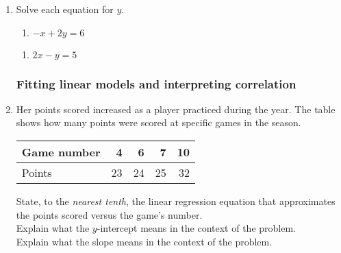 \documentclass[12pt, oneside]{article}
\begin{document}
\begin{enumerate}
  \item Solve each equation for $y$.
  \begin{multicols}{2}
    \raggedcolumns
    \begin{enumerate}
      \item $-x+2y=6$\\[0.5cm]
    \end{enumerate}
    \begin{enumerate}
      \item $2x-y=5$ \\[0.5cm]
    \end{enumerate}
  \end{multicols}

  \newpage


\subsubsection*{Fitting linear models and interpreting correlation}
\item Her points scored increased as a player practiced during the year.  The table shows how many points were scored at specific games in the season.
  \renewcommand{\arraystretch}{1.6}
    \begin{center}
      \begin{tabular}{|l|r|r|r|r|}
      \hline
      Game number & 4 & 6 & 7 & 10 \\
      \hline
      Points  & 23 & 24 & 25 & 32 \\
      \hline
      \end{tabular}
    \end{center}

    \begin{center} %
    \end{center}

    State, to the \emph{nearest tenth}, the linear regression equation that approximates the points scored versus the game's number.\\[2cm]
    Explain what the $y$-intercept means in the context of the problem. \\[3cm]
    Explain what the slope means in the context of the problem.


\end{enumerate}
\end{document}

